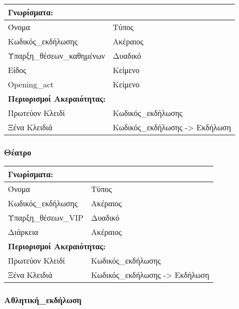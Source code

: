 \begin{tabular}{|p{6cm}|p{8cm}|}
  \multicolumn{2}{l}{\textbf{Γνωρίσματα:}}                   \\ \hline
  Όνομα                     & Τύπος                          \\ \hline
  Κωδικός\_εκδήλωσης        & Ακέραιος                       \\ \hline
  Ύπαρξη\_θέσεων\_καθημένων & Δυαδικό                        \\ \hline
  Είδος                     & Κείμενο                        \\ \hline
  Opening\_act              & Κείμενο                        \\ \hline
  \multicolumn{2}{l}{\textbf{Περιορισμοί Ακεραιότητας:}}     \\ \hline
  Πρωτεύον Κλειδί           & Κωδικός\_εκδήλωσης             \\ \hline
  Ξένα Κλειδιά              & Κωδικός\_εκδήλωσης -> Εκδήλωση \\ \hline
\end{tabular}

\subsubsection*{Θέατρο}

\begin{tabular}{|p{6cm}|p{8cm}|}
  \multicolumn{2}{l}{\textbf{Γνωρίσματα:}}               \\ \hline
  Όνομα               & Τύπος                            \\ \hline
  Κωδικός\_εκδήλωσης  & Ακέραιος                         \\ \hline
  Ύπαρξη\_θέσεων\_VIP & Δυαδικό                          \\ \hline
  Διάρκεια            & Ακέραιος                         \\ \hline
  \multicolumn{2}{l}{\textbf{Περιορισμοί Ακεραιότητας:}} \\ \hline
  Πρωτεύον Κλειδί     & Κωδικός\_εκδήλωσης               \\ \hline
  Ξένα Κλειδιά        & Κωδικός\_εκδήλωσης -> Εκδήλωση   \\ \hline
\end{tabular}

\subsubsection*{Αθλητική\_εκδήλωση}

